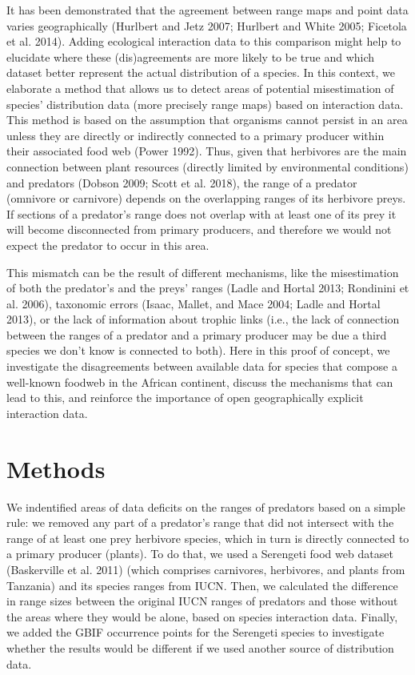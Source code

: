 \documentclass[10pt,oneside]{article}
\begin{document}
It has been demonstrated that the agreement between range maps and point
data varies geographically (Hurlbert and Jetz 2007; Hurlbert and White
2005; Ficetola et al. 2014). Adding ecological interaction data to this
comparison might help to elucidate where these (dis)agreements are more
likely to be true and which dataset better represent the actual
distribution of a species. In this context, we elaborate a method that
allows us to detect areas of potential misestimation of species'
distribution data (more precisely range maps) based on interaction data.
This method is based on the assumption that organisms cannot persist in
an area unless they are directly or indirectly connected to a primary
producer within their associated food web (Power 1992). Thus, given that
herbivores are the main connection between plant resources (directly
limited by environmental conditions) and predators (Dobson 2009; Scott
et al. 2018), the range of a predator (omnivore or carnivore) depends on
the overlapping ranges of its herbivore preys. If sections of a
predator's range does not overlap with at least one of its prey it will
become disconnected from primary producers, and therefore we would not
expect the predator to occur in this area.

This mismatch can be the result of different mechanisms, like the
misestimation of both the predator's and the preys' ranges (Ladle and
Hortal 2013; Rondinini et al. 2006), taxonomic errors (Isaac, Mallet,
and Mace 2004; Ladle and Hortal 2013), or the lack of information about
trophic links (i.e., the lack of connection between the ranges of a
predator and a primary producer may be due a third species we don't know
is connected to both). Here in this proof of concept, we investigate the
disagreements between available data for species that compose a
well-known foodweb in the African continent, discuss the mechanisms that
can lead to this, and reinforce the importance of open geographically
explicit interaction data.

\hypertarget{methods}{%
\section{Methods}\label{methods}}

We indentified areas of data deficits on the ranges of predators based
on a simple rule: we removed any part of a predator's range that did not
intersect with the range of at least one prey herbivore species, which
in turn is directly connected to a primary producer (plants). To do
that, we used a Serengeti food web dataset (Baskerville et al. 2011)
(which comprises carnivores, herbivores, and plants from Tanzania) and
its species ranges from IUCN. Then, we calculated the difference in
range sizes between the original IUCN ranges of predators and those
without the areas where they would be alone, based on species
interaction data. Finally, we added the GBIF occurrence points for the
Serengeti species to investigate whether the results would be different
if we used another source of distribution data.
\end{document}
